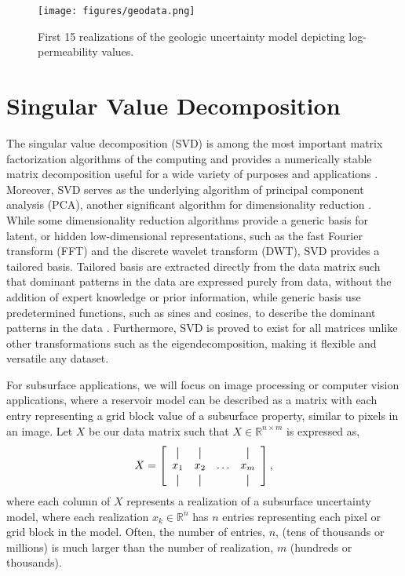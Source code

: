 \documentclass[a4paper,fleqn,12pt]{article}
\begin{document}
\begin{figure}[H]
    \centering
    \texttt{[image: figures/geodata.png]}
    \caption{First 15 realizations of the geologic uncertainty model depicting log-permeability values.}
    \label{fig:geodata}
\end{figure}

\pagebreak
\section*{Singular Value Decomposition}
The singular value decomposition (SVD) is among the most important matrix factorization algorithms of the computing and provides a numerically stable matrix decomposition useful for a wide variety of purposes and applications \cite{klema1980singular, stewart1993early}. Moreover, SVD serves as the underlying algorithm of principal component analysis (PCA), another significant algorithm for dimensionality reduction \cite{wall2003singular, baker2005singular}. While some dimensionality reduction algorithms provide a generic basis for latent, or hidden low-dimensional representations, such as the fast Fourier transform (FFT) and the discrete wavelet transform (DWT), SVD provides a tailored basis. Tailored basis are extracted directly from the data matrix such that dominant patterns in the data are expressed purely from data, without the addition of expert knowledge or prior information, while generic basis use predetermined functions, such as sines and cosines, to describe the dominant patterns in the data \cite{brunton2022data, afra2016tensor}. Furthermore, SVD is proved to exist for all matrices unlike other transformations such as the eigendecomposition, making it flexible and versatile any dataset. 

For subsurface applications, we will focus on image processing or computer vision applications, where a reservoir model can be described as a matrix with each entry representing a grid block value of a subsurface property, similar to pixels in an image. Let $X$ be our data matrix such that $X\in \mathbb{R}^{n\times m}$ is expressed as, 
\begin{equation}
    X = \left[\begin{array}{cccc}
                        \vertbar & \vertbar &        & \vertbar \\
                        x_{1}    & x_{2}    & \ldots & x_{m}    \\
                        \vertbar & \vertbar &        & \vertbar 
                        \end{array}\right], 
\end{equation}
where each column of $X$ represents a realization of a subsurface uncertainty model, where each realization $x_k\in\mathbb{R}^n$ has $n$ entries representing each pixel or grid block in the model. Often, the number of entries, $n$, (tens of thousands or millions) is much larger than the number of realization, $m$ (hundreds or thousands). 
\end{document}
